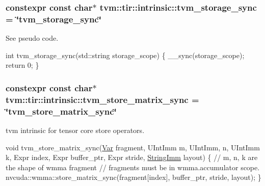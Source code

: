 \subsubsection[{\texorpdfstring{tvm\+\_\+storage\+\_\+sync}{tvm_storage_sync}}]{\setlength{\rightskip}{0pt plus 5cm}constexpr const char$\ast$ tvm\+::tir\+::intrinsic\+::tvm\+\_\+storage\+\_\+sync = \char`\"{}tvm\+\_\+storage\+\_\+sync\char`\"{}}\hypertarget{namespacetvm_1_1tir_1_1intrinsic_a327df78182d6687b72a93c468a3cd962}{}\label{namespacetvm_1_1tir_1_1intrinsic_a327df78182d6687b72a93c468a3cd962}


See pseudo code. 

int tvm\+\_\+storage\+\_\+sync(std\+::string storage\+\_\+scope) \{ \+\_\+\+\_\+sync(storage\+\_\+scope); return 0; \} 
\subsubsection[{\texorpdfstring{tvm\+\_\+store\+\_\+matrix\+\_\+sync}{tvm_store_matrix_sync}}]{\setlength{\rightskip}{0pt plus 5cm}constexpr const char$\ast$ tvm\+::tir\+::intrinsic\+::tvm\+\_\+store\+\_\+matrix\+\_\+sync = \char`\"{}tvm\+\_\+store\+\_\+matrix\+\_\+sync\char`\"{}}\hypertarget{namespacetvm_1_1tir_1_1intrinsic_a3127cfee7b97ef7182019e69b7a3eb78}{}\label{namespacetvm_1_1tir_1_1intrinsic_a3127cfee7b97ef7182019e69b7a3eb78}


tvm intrinsic for tensor core store operators. 

void tvm\+\_\+store\+\_\+matrix\+\_\+sync(\hyperlink{classtvm_1_1tir_1_1Var}{Var} fragment, U\+Int\+Imm m, U\+Int\+Imm, n, U\+Int\+Imm k, Expr index, Expr buffer\+\_\+ptr, Expr stride, \hyperlink{classtvm_1_1tir_1_1StringImm}{String\+Imm} layout) \{ // m, n, k are the shape of wmma fragment // fragments must be in \textquotesingle{}wmma.\+accumulator\textquotesingle{} scope. nvcuda\+::wmma\+::store\+\_\+matrix\+\_\+sync(fragment\mbox{[}index\mbox{]}, buffer\+\_\+ptr, stride, layout); \} 
